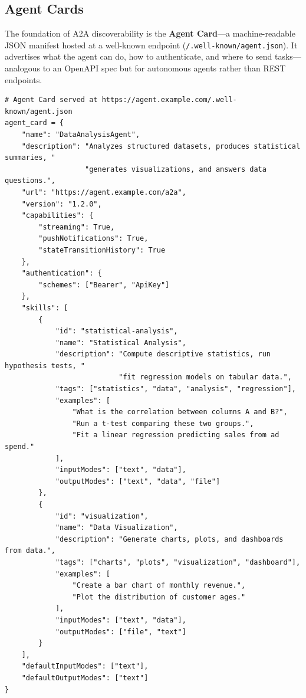 \subsection{Agent Cards}
\label{agent-cards}

The foundation of A2A discoverability is the \textbf{Agent Card}---a machine-readable JSON manifest hosted at a well-known endpoint (\texttt{/.well-known/agent.json}). It advertises what the agent can do, how to authenticate, and where to send tasks---analogous to an OpenAPI spec but for autonomous agents rather than REST endpoints.

\begin{examplebox}
\begin{lstlisting}[style=pythonstyle]
# Agent Card served at https://agent.example.com/.well-known/agent.json
agent_card = {
    "name": "DataAnalysisAgent",
    "description": "Analyzes structured datasets, produces statistical summaries, "
                   "generates visualizations, and answers data questions.",
    "url": "https://agent.example.com/a2a",
    "version": "1.2.0",
    "capabilities": {
        "streaming": True,
        "pushNotifications": True,
        "stateTransitionHistory": True
    },
    "authentication": {
        "schemes": ["Bearer", "ApiKey"]
    },
    "skills": [
        {
            "id": "statistical-analysis",
            "name": "Statistical Analysis",
            "description": "Compute descriptive statistics, run hypothesis tests, "
                           "fit regression models on tabular data.",
            "tags": ["statistics", "data", "analysis", "regression"],
            "examples": [
                "What is the correlation between columns A and B?",
                "Run a t-test comparing these two groups.",
                "Fit a linear regression predicting sales from ad spend."
            ],
            "inputModes": ["text", "data"],
            "outputModes": ["text", "data", "file"]
        },
        {
            "id": "visualization",
            "name": "Data Visualization",
            "description": "Generate charts, plots, and dashboards from data.",
            "tags": ["charts", "plots", "visualization", "dashboard"],
            "examples": [
                "Create a bar chart of monthly revenue.",
                "Plot the distribution of customer ages."
            ],
            "inputModes": ["text", "data"],
            "outputModes": ["file", "text"]
        }
    ],
    "defaultInputModes": ["text"],
    "defaultOutputModes": ["text"]
}
\end{lstlisting}
\end{examplebox}

